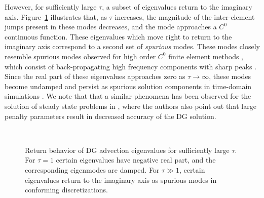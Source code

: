 \documentclass[preprint,10pt]{elsarticle}
\begin{document}
However, for sufficiently large $\tau$, a subset of eigenvalues return to the imaginary axis.  Figure~\ref{fig:spurious} illustrates that, as $\tau$ increases, the magnitude of the inter-element jumps present in these modes decreases, and the mode approaches a $C^0$ continuous function.  These eigenvalues which move right to return to the imaginary axis correspond to a second set of \emph{spurious} modes.  These modes closely resemble spurious modes observed for high order $C^0$ finite element methods \cite{boffi2000problem}, which consist of back-propagating high frequency components with sharp peaks \cite{ainsworth2014dispersive}.  Since the real part of these eigenvalues approaches zero as $\tau\rightarrow \infty$, these modes become undamped and persist as spurious solution components in time-domain simulations \cite{hughes2014finite}.  We note that that a similar phenomena has been observed for the solution of steady state problems in \cite{burman2010interior}, where the authors also point out that large penalty parameters result in decreased accuracy of the DG solution.  

\begin{figure}
\centering
{}
\hspace{.5em}
\hspace{.5em}
\\
\hspace{.5em}
\hspace{.5em}
\caption{Return behavior of DG advection eigenvalues for sufficiently large $\tau$.  For $\tau = 1$ certain eigenvalues have negative real part, and the corresponding eigenmodes are damped.  For $\tau \gg 1$, certain eigenvalues return to the imaginary axis as spurious modes in conforming discretizations. }
\label{fig:spurious}
\end{figure}
\end{document}
